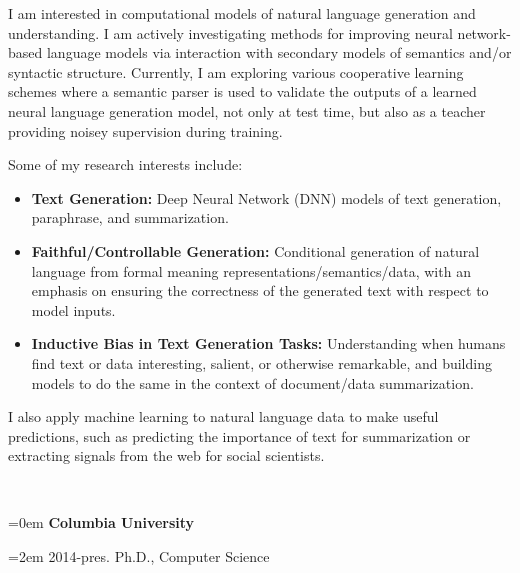 \documentclass{scrartcl}
\newcommand{\MarginSection}[1]{\marginpar{#1}}
\begin{document}
\begin{cv}{}
I am interested in computational models of natural language generation and understanding. I am actively investigating methods for improving neural network-based language models via interaction with secondary models of semantics and/or syntactic structure. Currently, I am exploring various cooperative learning schemes where a semantic parser is used to validate the outputs of a learned neural language generation model, not only at test time, but also as a teacher providing noisey supervision during training. 

Some of my research interests include:

\begin{itemize}
    \item \textbf{Text Generation:} Deep Neural Network (DNN) models of text generation, paraphrase, and summarization.
    \item \textbf{Faithful/Controllable Generation:} Conditional generation of natural language from formal meaning representations/semantics/data, with an emphasis on ensuring the correctness of the generated text with respect to model inputs.
    \item \textbf{Inductive Bias in Text Generation Tasks:} Understanding when humans find text or data interesting, salient, or otherwise remarkable, and building models to do the same in the context of document/data summarization.
\end{itemize}


I also apply machine learning to natural language data to make useful predictions, such as predicting the importance of text for summarization or extracting signals from the web for social scientists.

 




 ~\\


{\noindent\hangindent=0em \MarginSection{Education}\textbf{Columbia University}

 \noindent\hangindent=2em 2014-pres. Ph.D., Computer Science 

}
\end{cv}
\end{document}
